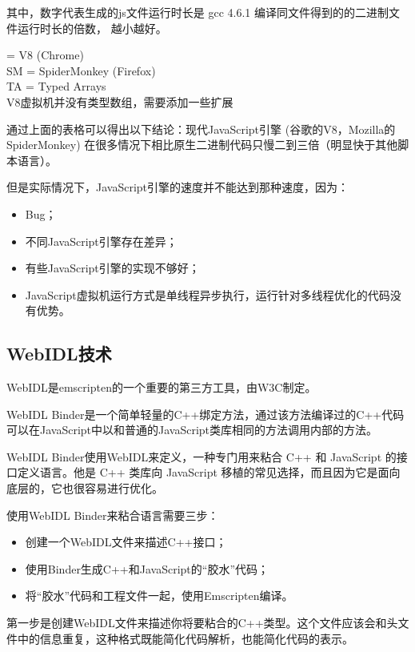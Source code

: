 \noindent 其中，数字代表生成的js文件运行时长是 gcc 4.6.1 编译同文件得到的的二进制文件运行时长的倍数，
越小越好。

 = V8 (Chrome) \\
{\heiti SM} = SpiderMonkey (Firefox) \\ 
{\heiti TA} = Typed Arrays \\
{\heiti *} V8虚拟机并没有类型数组，需要添加一些扩展


通过上面的表格可以得出以下结论：现代JavaScript引擎 (谷歌的V8，Mozilla的SpiderMonkey) 在很多情况下相比原生二进制代码只慢二到三倍（明显快于其他脚本语言）。

但是实际情况下，JavaScript引擎的速度并不能达到那种速度，因为：

\begin{itemize}[itemindent=2em]
    \item Bug；
    \item 不同JavaScript引擎存在差异；
    \item 有些JavaScript引擎的实现不够好；
    \item JavaScript虚拟机运行方式是单线程异步执行，运行针对多线程优化的代码没有优势。
\end{itemize}

\subsection{WebIDL技术}

WebIDL是emscripten的一个重要的第三方工具，由W3C制定。

WebIDL Binder是一个简单轻量的C++绑定方法，通过该方法编译过的C++代码可以在JavaScript中以和普通的JavaScript类库相同的方法调用内部的方法。

WebIDL Binder使用WebIDL来定义，一种专门用来粘合 C++ 和 JavaScript 的接口定义语言。他是 C++ 类库向 JavaScript 移植的常见选择，而且因为它是面向底层的，它也很容易进行优化。

使用WebIDL Binder来粘合语言需要三步：

\begin{itemize}[itemindent=2em]
    \item 创建一个WebIDL文件来描述C++接口；
    \item 使用Binder生成C++和JavaScript的“胶水”代码；
    \item 将“胶水”代码和工程文件一起，使用Emscripten编译。
\end{itemize}

第一步是创建WebIDL文件来描述你将要粘合的C++类型。这个文件应该会和头文件中的信息重复，这种格式既能简化代码解析，也能简化代码的表示。

